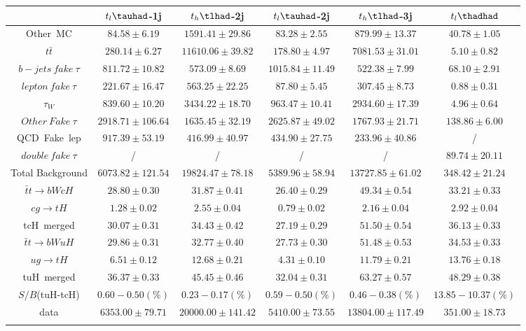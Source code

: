 \centering
\begin{tabular}{cccccc} \toprule\toprule
 & $t_{l}\tauhad$-1j & $t_{h}\tlhad$-2j & $t_{l}\tauhad$-2j & $t_{h}\tlhad$-3j & $t_{l}\thadhad$\\\midrule
Other~MC & $84.58\pm6.19$ & $1591.41\pm29.86$ & $83.28\pm2.55$ & $879.99\pm13.37$ & $40.78\pm1.05$\\
$t\bar{t}$ & $280.14\pm6.27$ & $11610.06\pm39.82$ & $178.80\pm4.97$ & $7081.53\pm31.01$ & $5.10\pm0.82$\\
$b-jets~fake~\tau$ & $811.72\pm10.82$ & $573.09\pm8.69$ & $1015.84\pm11.49$ & $522.38\pm7.99$ & $68.10\pm2.91$\\
$lepton~fake~\tau$ & $221.67\pm16.47$ & $563.25\pm22.25$ & $87.80\pm5.45$ & $307.45\pm8.73$ & $0.88\pm0.31$\\
$\tau_{W}$ & $839.60\pm10.20$ & $3434.22\pm18.70$ & $963.47\pm10.41$ & $2934.60\pm17.39$ & $4.96\pm0.64$\\
$Other~Fake~\tau$ & $2918.71\pm106.64$ & $1635.45\pm32.19$ & $2625.87\pm49.02$ & $1767.93\pm21.71$ & $138.86\pm6.00$\\
QCD~Fake~lep & $917.39\pm53.19$ & $416.99\pm40.97$ & $434.90\pm27.75$ & $233.96\pm40.86$ &  /\\
$double~fake~\tau$ &  / &  / &  / &  / & $89.74\pm20.11$\\\midrule
Total Background & $6073.82\pm121.54$ & $19824.47\pm78.18$ & $5389.96\pm58.94$ & $13727.85\pm61.02$ & $348.42\pm21.24$\\\midrule\midrule
$\bar{t}t\to bWcH$ & $28.80\pm0.30$ & $31.87\pm0.41$ & $26.40\pm0.29$ & $49.34\pm0.54$ & $33.21\pm0.33$\\
$cg\to tH$ & $1.28\pm0.02$ & $2.55\pm0.04$ & $0.79\pm0.02$ & $2.16\pm0.04$ & $2.92\pm0.04$\\
tcH~merged & $30.07\pm0.31$ & $34.43\pm0.42$ & $27.19\pm0.29$ & $51.50\pm0.54$ & $36.13\pm0.33$\\\midrule
$\bar{t}t\to bWuH$ & $29.86\pm0.31$ & $32.77\pm0.40$ & $27.73\pm0.30$ & $51.48\pm0.53$ & $34.53\pm0.33$\\
$ug\to tH$ & $6.51\pm0.12$ & $12.68\pm0.21$ & $4.31\pm0.10$ & $11.79\pm0.21$ & $13.76\pm0.18$\\
tuH~merged & $36.37\pm0.33$ & $45.45\pm0.46$ & $32.04\pm0.31$ & $63.27\pm0.57$ & $48.29\pm0.38$\\\midrule\midrule
$S/B$(tuH-tcH)  & $0.60-0.50(\%)$ & $0.23-0.17(\%)$ &  $0.59-0.50(\%)$   & $0.46-0.38(\%)$ &  $13.85-10.37(\%)$ \\\midrule\midrule
data & $6353.00\pm79.71$ & $20000.00\pm141.42$ & $5410.00\pm73.55$ & $13804.00\pm117.49$ & $351.00\pm18.73$\\
\bottomrule\bottomrule\\
\end{tabular}


